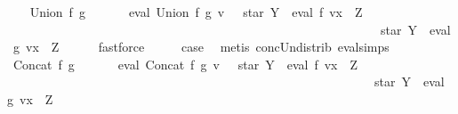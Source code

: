 \begin{isabellebody}
\isamarkupfalse%
\isanewline
\ \ \isamarkupfalse%
\ {\isacharparenleft}{\kern0pt}Union\ f\ g{\isacharparenright}{\kern0pt}\isanewline
\ \ \isamarkupfalse%
\ \isamarkupfalse%
\ {\isachardoublequoteopen}{\isasymPsi}\ {\isacharparenleft}{\kern0pt}eval\ {\isacharparenleft}{\kern0pt}Union\ f\ g{\isacharparenright}{\kern0pt}\ v{\isacharparenright}{\kern0pt}\ {\isasymsubseteq}\ {\isasymPsi}\ {\isacharparenleft}{\kern0pt}star\ Y\ {\isacharat}{\kern0pt}{\isacharat}{\kern0pt}\ eval\ f\ {\isacharparenleft}{\kern0pt}v{\isacharparenleft}{\kern0pt}x\ {\isacharcolon}{\kern0pt}{\isacharequal}{\kern0pt}\ Z{\isacharparenright}{\kern0pt}{\isacharparenright}{\kern0pt}\ {\isasymunion}\isanewline
\ \ \ \ \ \ \ \ \ \ \ \ \ \ \ \ \ \ \ \ \ \ \ \ \ \ \ \ \ \ \ \ \ \ \ \ \ \ \ \ \ \ \ \ \ \ \ \ \ \ \ \ \ \ \ \ \ \ \ \ star\ Y\ {\isacharat}{\kern0pt}{\isacharat}{\kern0pt}\ eval\ g\ {\isacharparenleft}{\kern0pt}v{\isacharparenleft}{\kern0pt}x\ {\isacharcolon}{\kern0pt}{\isacharequal}{\kern0pt}\ Z{\isacharparenright}{\kern0pt}{\isacharparenright}{\kern0pt}{\isacharparenright}{\kern0pt}{\isachardoublequoteclose}\isanewline
\ \ \ \ \isamarkupfalse%
\ fastforce\isanewline
\ \ \isamarkupfalse%
\ \isamarkupfalse%
\ {\isacharquery}{\kern0pt}case\ \isamarkupfalse%
\ {\isacharparenleft}{\kern0pt}metis\ conc{\isacharunderscore}{\kern0pt}Un{\isacharunderscore}{\kern0pt}distrib{\isacharparenleft}{\kern0pt}{}{\isacharparenright}{\kern0pt}\ eval{\isachardot}{\kern0pt}simps{\isacharparenleft}{\kern0pt}{}{\isacharparenright}{\kern0pt}{\isacharparenright}{\kern0pt}\isanewline
{}\isamarkupfalse%
\isanewline
\ \ \isamarkupfalse%
\ {\isacharparenleft}{\kern0pt}Concat\ f\ g{\isacharparenright}{\kern0pt}\isanewline
\ \ \isamarkupfalse%
\ \isamarkupfalse%
\ {\isachardoublequoteopen}{\isasymPsi}\ {\isacharparenleft}{\kern0pt}eval\ {\isacharparenleft}{\kern0pt}Concat\ f\ g{\isacharparenright}{\kern0pt}\ v{\isacharparenright}{\kern0pt}\ {\isasymsubseteq}\ {\isasymPsi}\ {\isacharparenleft}{\kern0pt}{\isacharparenleft}{\kern0pt}star\ Y\ {\isacharat}{\kern0pt}{\isacharat}{\kern0pt}\ eval\ f\ {\isacharparenleft}{\kern0pt}v{\isacharparenleft}{\kern0pt}x\ {\isacharcolon}{\kern0pt}{\isacharequal}{\kern0pt}\ Z{\isacharparenright}{\kern0pt}{\isacharparenright}{\kern0pt}{\isacharparenright}{\kern0pt}\isanewline
\ \ \ \ \ \ \ \ \ \ \ \ \ \ \ \ \ \ \ \ \ \ \ \ \ \ \ \ \ \ \ \ \ \ \ \ \ \ \ \ \ \ \ \ \ \ \ \ \ \ \ \ \ \ \ \ \ \ {\isacharat}{\kern0pt}{\isacharat}{\kern0pt}\ star\ Y\ {\isacharat}{\kern0pt}{\isacharat}{\kern0pt}\ eval\ g\ {\isacharparenleft}{\kern0pt}v{\isacharparenleft}{\kern0pt}x\ {\isacharcolon}{\kern0pt}{\isacharequal}{\kern0pt}\ Z{\isacharparenright}{\kern0pt}{\isacharparenright}{\kern0pt}{\isacharparenright}{\kern0pt}{\isachardoublequoteclose}\isanewline

\end{isabellebody}

